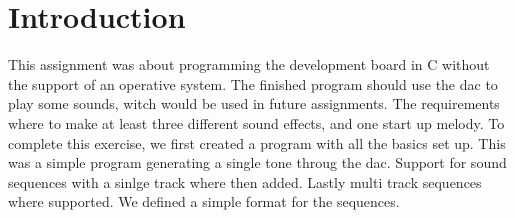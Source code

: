\section{Introduction}
This assignment was about programming the development board in C without the support of an operative system. The finished program should use the dac to play some sounds, witch would be used in future assignments. The requirements where to make at least three different sound effects, and one start up melody. 
To complete this exercise, we first created a program with all the basics set up. This was a simple program generating a single tone throug the dac. Support for sound sequences with a sinlge track where then added. Lastly multi track sequences where supported. We defined a simple format for the sequences.
